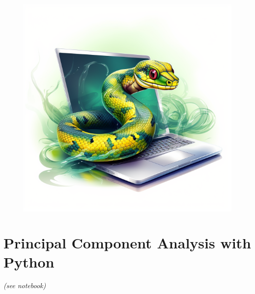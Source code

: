 \documentclass[]{article}
\begin{document}
	
	\begin{figure}
		\vspace{-3.25cm}
		\hspace{2.25cm}
		\includegraphics[width=0.8\linewidth]{python}
	\end{figure}
	\section{Principal Component Analysis with Python}
	\textit{(see notebook)}
\end{document}
